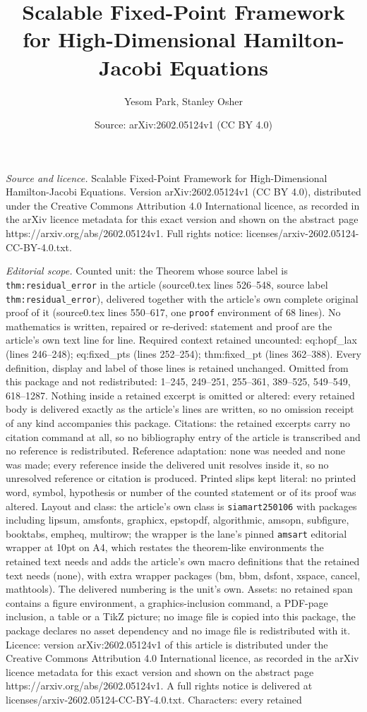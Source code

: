 \documentclass[10pt,a4paper]{amsart}
\title[Scalable Fixed-Point Framework for High-Dimensional Hamilton]{Scalable Fixed-Point Framework for High-Dimensional Hamilton-Jacobi Equations}
\author{Yesom Park, Stanley Osher}
\date{Source: arXiv:2602.05124v1 (CC BY 4.0)}
\begin{document}
\maketitle

\noindent\emph{Source and licence.} Scalable Fixed-Point Framework for High-Dimensional Hamilton-Jacobi Equations. Version arXiv:2602.05124v1 (CC BY 4.0), distributed under the Creative Commons Attribution 4.0 International licence, as recorded in the arXiv licence metadata for this exact version and shown on the abstract page https://arxiv.org/abs/2602.05124v1. Full rights notice: licenses/arxiv-2602.05124-CC-BY-4.0.txt.\par\smallskip

\noindent\textit{Editorial scope.} Counted unit: the Theorem whose source label is \texttt{thm:residual\_error} in the article (source0.tex lines 526--548, source label \texttt{thm:residual\_error}), delivered together with the article's own complete original proof of it (source0.tex lines 550--617, one \texttt{proof} environment of 68 lines). No mathematics is written, repaired or re-derived: statement and proof are the article's own text line for line. Required context retained uncounted: eq:hopf\_lax (lines 246--248); eq:fixed\_pts (lines 252--254); thm:fixed\_pt (lines 362--388). Every definition, display and label of those lines is retained unchanged. Omitted from this package and not redistributed: 1--245, 249--251, 255--361, 389--525, 549--549, 618--1287. Nothing inside a retained excerpt is omitted or altered: every retained body is delivered exactly as the article's lines are written, so no omission receipt of any kind accompanies this package. Citations: the retained excerpts carry no citation command at all, so no bibliography entry of the article is transcribed and no reference is redistributed. Reference adaptation: none was needed and none was made; every reference inside the delivered unit resolves inside it, so no unresolved reference or citation is produced. Printed slips kept literal: no printed word, symbol, hypothesis or number of the counted statement or of its proof was altered. Layout and class: the article's own class is \texttt{siamart250106} with packages including lipsum, amsfonts, graphicx, epstopdf, algorithmic, amsopn, subfigure, booktabs, empheq, multirow; the wrapper is the lane's pinned \texttt{amsart} editorial wrapper at 10pt on A4, which restates the theorem-like environments the retained text needs and adds the article's own macro definitions that the retained text needs (none), with extra wrapper packages (bm, bbm, dsfont, xspace, cancel, mathtools). The delivered numbering is the unit's own. Assets: no retained span contains a figure environment, a graphics-inclusion command, a PDF-page inclusion, a table or a TikZ picture; no image file is copied into this package, the package declares no asset dependency and no image file is redistributed with it. Licence: version arXiv:2602.05124v1 of this article is distributed under the Creative Commons Attribution 4.0 International licence, as recorded in the arXiv licence metadata for this exact version and shown on the abstract page https://arxiv.org/abs/2602.05124v1. A full rights notice is delivered at licenses/arxiv-2602.05124-CC-BY-4.0.txt. Characters: every retained 
\end{document}
